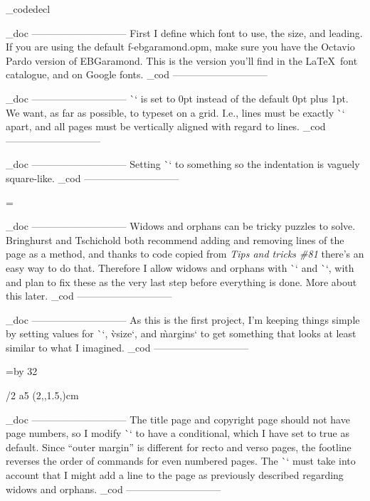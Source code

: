 \_codedecl 

    \_doc -----------------------------
    First I define which font to use, the size, and leading.    
    If you are using the default f-ebgaramond.opm, 
    make sure you have the Octavio Pardo version of EBGaramond.
    This is the version you’ll find in the \LaTeX\ font catalogue,
    and on Google fonts.
    \_cod -----------------------------

\fontfam[ebgaramond]
\typosize[11/14]

    \_doc -----------------------------
    \`\parskip` is set to 0pt instead of the default 0pt plus 1pt.
    We want, as far as possible, to typeset on a grid. 
    I.e., lines must be exactly \`\baselineskip` apart,
    and all pages must be vertically aligned with regard to lines.
    \_cod -----------------------------

\parskip=0pt

    \_doc -----------------------------
    Setting \`\parindent` to something so the indentation is vaguely
    square-like. 
    \_cod -----------------------------

\parindent=\baselineskip

    \_doc -----------------------------
    Widows and orphans can be tricky puzzles to solve. 
    Bringhurst and Tschichold both recommend adding and removing lines
    of the page as a method, and thanks to code copied from
    {\em Tips and tricks \#81} there’s an easy way to do that.
    Therefore I allow widows and orphans with \`\widowpenalty` and 
    \`\clubpenalty`, with  and plan to fix these
    as the very last step before everything is done. More about this later.
    \_cod -----------------------------


    \_doc -----------------------------
    As this is the first project, I'm keeping things simple by setting
    values for \`\hsize`, \`vsize`, and \`margins` to get something
    that looks at least similar to what I imagined.
    \_cod -----------------------------

\hsize=10cm
\vsize=\topskip \advance\vsize by 32\baselineskip %

\margins/2 a5 (2,,1.5,)cm

    \_doc -----------------------------
    The title page and copyright page should not have page numbers, so
    I modify \`\footline` to have a conditional, which I have set to true 
    as default. Since “outer margin” is different for recto and verso pages,
    the footline reverses the order of commands for even numbered pages.
    The \`\footlinedist` must take into account that I might add a line
    to the page as previously described regarding widows and orphans.
    \_cod -----------------------------

